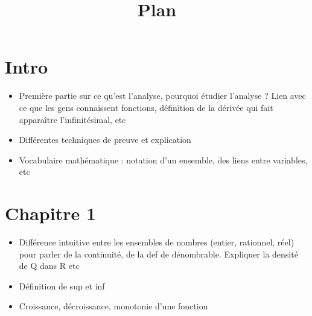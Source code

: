 \documentclass{article}
\title{Plan}
\begin{document}
\maketitle


\section{Intro}
\begin{itemize}
    \item Première partie sur ce qu'est l'analyse, pourquoi étudier l'analyse ? Lien avec ce que les gens connaissent fonctions, définition de la dérivée qui fait apparaître l'infinitésimal, etc
    \item Différentes techniques de preuve et explication
    \item Vocabulaire mathématique : notation d'un ensemble, des liens entre variables, etc
\end{itemize}


\section{Chapitre 1}

\begin{itemize}   
    \item Différence intuitive entre les ensembles de nombres (entier, rationnel, réel) pour parler de la continuité, de la def de dénombrable. Expliquer la densité de Q dans R etc
    \item Définition de sup et inf 
    \item Croissance, décroissance, monotonie d'une fonction 
\end{itemize}
\end{document}
